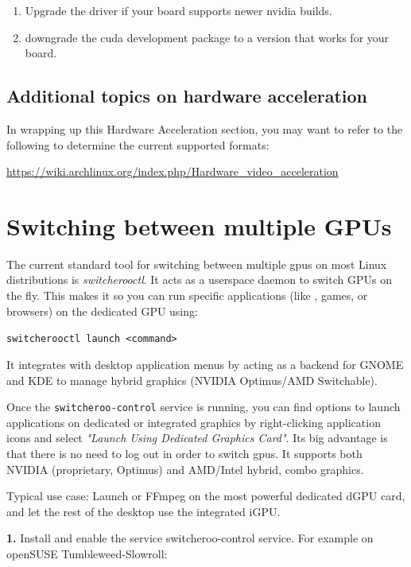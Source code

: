 \begin{enumerate}
	\item Upgrade the driver if your board supports newer nvidia builds.
	\item downgrade the cuda development package to a version that works for your board.
\end{enumerate}

\subsection{Additional topics on hardware acceleration}%
\label{sub:final_note_on_acceleration}

In wrapping up this Hardware Acceleration section, you may want to refer to the following to determine the current supported formats:

{\small \url{https://wiki.archlinux.org/index.php/Hardware_video_acceleration}}

\section{Switching between multiple GPUs}%
\label{sec:switcherooctl}

The current standard tool for switching between multiple gpus on most Linux distributions
is \textit{switcherooctl}. It acts as a userspace daemon to switch GPUs on the fly. This
makes it so you can run specific applications (like \CGG{}, games, or browsers) on the dedicated
GPU using:

\hspace*{1cm}\texttt{switcherooctl launch <command>}

It integrates with desktop application menus by acting as a backend for GNOME and KDE to manage hybrid graphics (NVIDIA Optimus/AMD Switchable).

Once the \texttt{switcheroo-control} service is running, you can find options to launch applications on dedicated or integrated graphics by right-clicking application icons and select \textit{"Launch Using Dedicated Graphics Card"}.
Its big advantage is that there is no need to log out in order to switch gpus. It supports both NVIDIA (proprietary, Optimus) and AMD/Intel hybrid, combo graphics. 

Typical use case: Launch \CGG{} or FFmpeg on the most powerful dedicated dGPU card, and let the rest of the desktop use the integrated iGPU.

\textbf{1.} Install and  enable the service switcheroo-control service. For example on openSUSE Tumbleweed-Slowroll:

